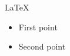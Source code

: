 \documentclass[11pt, a4paper]{article} %
\begin{document}

\LaTeX{}



\begin{itemize}
  \item First point
  \item Second point
\end{itemize}
\end{document}
